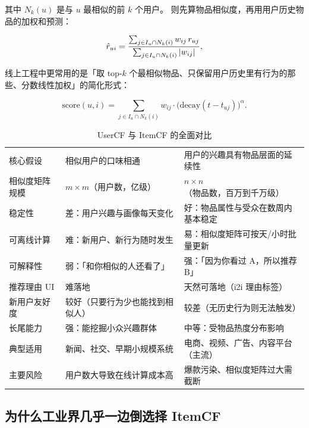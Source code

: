 其中 $N_k(u)$ 是与 $u$ 最相似的前 $k$ 个用户。 则先算物品相似度，再用用户历史物品的加权和预测：

\begin{equation}
\hat{r}_{ui} = \frac{\sum_{j \in I_u \cap N_k(i)} w_{ij} \, r_{uj}}
{\sum_{j \in I_u \cap N_k(i)} \left\lvert w_{ij} \right\rvert} ,
\label{eq:itemcf}
\end{equation}

线上工程中更常用的是「取 top-$k$ 个最相似物品、只保留用户历史里有行为的那些、分数线性加权」的简化形式：

\begin{equation}
\text{score}(u, i) = \sum_{j \in I_u \cap N_k(i)} w_{ij} \cdot \big( \text{decay}(t - t_{uj}) \big)^{\alpha} .
\label{eq:itemcf-score}
\end{equation}

\begin{table}[htbp]
\centering
\caption{UserCF 与 ItemCF 的全面对比}
\label{tab:usercf-itemcf}
\small
\begin{tabularx}{\textwidth}{L{2.0cm} L{4.0cm} Y}
\toprule
{} &  &  \\
\midrule
核心假设 & 相似用户的口味相通 & 用户的兴趣具有物品层面的延续性 \\
相似度矩阵规模 & $m \times m$（用户数，亿级） & $n \times n$（物品数，百万到千万级） \\
稳定性 & 差：用户兴趣与画像每天变化 & 好：物品属性与受众在数周内基本稳定 \\
可离线计算 & 难：新用户、新行为随时发生 & 易：相似度矩阵可按天/小时批量更新 \\
可解释性 & 弱：「和你相似的人还看了」 & 强：「因为你看过 A，所以推荐 B」 \\
推荐理由 UI & 难落地 & 天然可落地（i2i 理由标签） \\
新用户友好度 & 较好（只要行为少也能找到相似人） & 较差（无历史行为则无法触发） \\
长尾能力 & 强：能挖掘小众兴趣群体 & 中等：受物品热度分布影响 \\
典型适用 & 新闻、社交、早期小规模系统 & 电商、视频、广告、内容平台（主流） \\
主要风险 & 用户数大导致在线计算成本高 & 爆款污染、相似度矩阵过大需截断 \\
\bottomrule
\end{tabularx}
\end{table}

\subsection{为什么工业界几乎一边倒选择 ItemCF}

